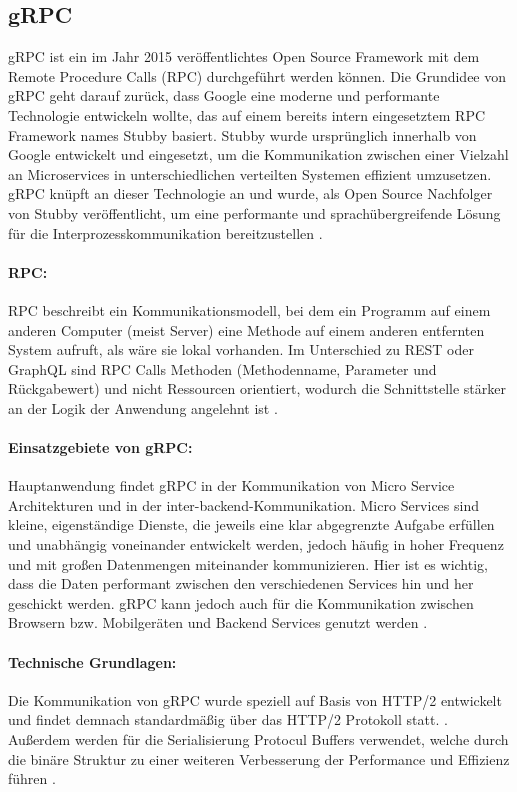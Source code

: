 \clearpage
\subsection{gRPC}
gRPC ist ein im Jahr 2015 veröffentlichtes Open Source Framework mit dem Remote Procedure Calls (RPC) durchgeführt werden können. Die Grundidee von gRPC geht darauf zurück, dass Google eine moderne und performante Technologie entwickeln wollte, das auf einem bereits intern eingesetztem RPC Framework names Stubby basiert. 
Stubby wurde ursprünglich innerhalb von Google entwickelt und eingesetzt, um die Kommunikation zwischen einer Vielzahl an Microservices in unterschiedlichen verteilten Systemen effizient umzusetzen. gRPC knüpft an dieser Technologie an und wurde, als Open Source Nachfolger von Stubby veröffentlicht, um eine performante und sprachübergreifende Lösung für die Interprozesskommunikation bereitzustellen \parencite{gRPCAbout}.


\paragraph{RPC:}
RPC beschreibt ein Kommunikationsmodell, bei dem ein Programm auf einem anderen Computer (meist Server) eine Methode auf einem anderen entfernten System aufruft, als wäre sie lokal vorhanden. Im Unterschied zu REST oder GraphQL sind RPC Calls Methoden (Methodenname, Parameter und Rückgabewert) und nicht Ressourcen orientiert, wodurch die Schnittstelle stärker an der Logik der Anwendung angelehnt ist \parencite{aws-rpc-vs-rest}.

\paragraph{Einsatzgebiete von gRPC:} Hauptanwendung findet gRPC in der Kommunikation von Micro Service Architekturen und in der inter-backend-Kommunikation. Micro Services sind kleine, eigenständige Dienste, die jeweils eine klar abgegrenzte Aufgabe erfüllen und unabhängig voneinander entwickelt werden, jedoch häufig in hoher Frequenz und mit großen Datenmengen miteinander kommunizieren. Hier ist es wichtig, dass die Daten performant zwischen den verschiedenen Services hin und her geschickt werden. gRPC kann jedoch auch für die Kommunikation zwischen Browsern bzw. Mobilgeräten und Backend Services genutzt werden \parencite{gRPCAbout}.

\paragraph{Technische Grundlagen:} Die Kommunikation von gRPC wurde speziell auf Basis von HTTP/2 entwickelt und findet demnach standardmäßig über das HTTP/2 Protokoll statt. \parencite{grpc-googleblog}. Außerdem werden für die Serialisierung Protocul Buffers verwendet, welche durch die binäre Struktur zu einer weiteren Verbesserung der Performance und Effizienz führen \parencite{protobufdocs}.

